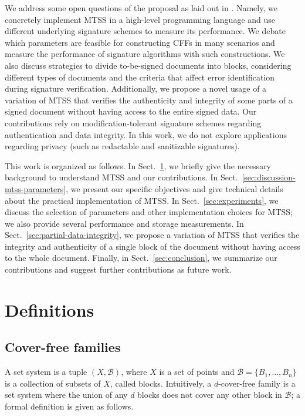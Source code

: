 \documentclass[12pt]{article}
\begin{document}
We address some open questions of the proposal as laid out in \cite{mtss-idalino-2019}. Namely, we concretely implement MTSS in a high-level programming language and use different underlying signature schemes to measure its performance. We debate which parameters are feasible for constructing CFFs in many scenarios and measure the performance of signature algorithms with such constructions. We also discuss strategies to divide to-be-signed documents into blocks, considering different types of documents and the criteria that affect error identification during signature verification. Additionally, we propose a novel usage of a variation of MTSS that verifies the authenticity and integrity of some parts of a signed document without having access to the entire signed data. Our contributions rely on modification-tolerant signature schemes regarding authentication and data integrity. In this work, we do not explore applications regarding privacy (such as redactable and sanitizable signatures).

This work is organized as follows. In Sect.~\ref{sec:definitions}, we briefly give the necessary background to understand MTSS and our contributions. In Sect.~\ref{sec:discussion-mtss-parameters}, we present our specific objectives and give technical details about the practical implementation of MTSS. In Sect.~\ref{sec:experiments}, we discuss the selection of parameters and other implementation choices for MTSS; we also provide several performance and storage measurements. In Sect.~\ref{sec:partial-data-integrity}, we propose a variation of MTSS that verifies the integrity and authenticity of a single block of the document without having access to the whole document. Finally, in Sect.~\ref{sec:conclusion}, we summarize our contributions and suggest further contributions as future work.

\section{Definitions}
\label{sec:definitions}


\subsection{Cover-free families}
\label{sec:cff}

A set system is a tuple $(X, \mathcal{B})$, where $X$ is a set of points and $\mathcal{B} = \{B_1, \ldots, B_n\}$ is a collection of subsets of $X$, called blocks. Intuitively, a $d$-cover-free family is a set system where the union of any $d$ blocks does not cover any other block in $\mathcal{B}$; a formal definition is given as follows.
\end{document}
